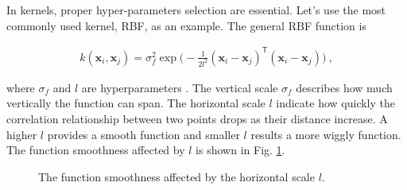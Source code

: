 \documentclass[12pt,letterpaper,fleqn,oneside,titlepage]{offroad-report}
\begin{document}
In kernels, proper hyper-parameters selection are essential. Let's use the most commonly used kernel, RBF, as an example. The general RBF function is 
\begin{ceqn}
    \begin{align}
        k(\mathbf{x}_i,\mathbf{x}_j) = \sigma_f^2 \exp \Big(-\frac{1}{2l^2}
         (\mathbf{x}_i - \mathbf{x}_j)^\mathsf{T}
         (\mathbf{x}_i - \mathbf{x}_j) \Big)  \ , \nonumber
    \end{align}
\end{ceqn}
where $\sigma_f$ and $l$ are hyperparameters \cite{duvenaud2014automatic}. The vertical scale $\sigma_f$ describes how much vertically the function can span. The horizontal scale $l$ indicate how quickly the correlation relationship between two points drops as their distance increase. A higher $l$ provides a smooth function and smaller $l$ results a more wiggly function. The function smoothness affected by $l$ is shown in Fig. \ref{FIG:11}. 
\begin{figure}[h!]
    \centering
    \qquad
    \qquad
    \caption{The function smoothness affected by the horizontal scale $l$.}%
    \label{FIG:11}
\end{figure}
\end{document}

